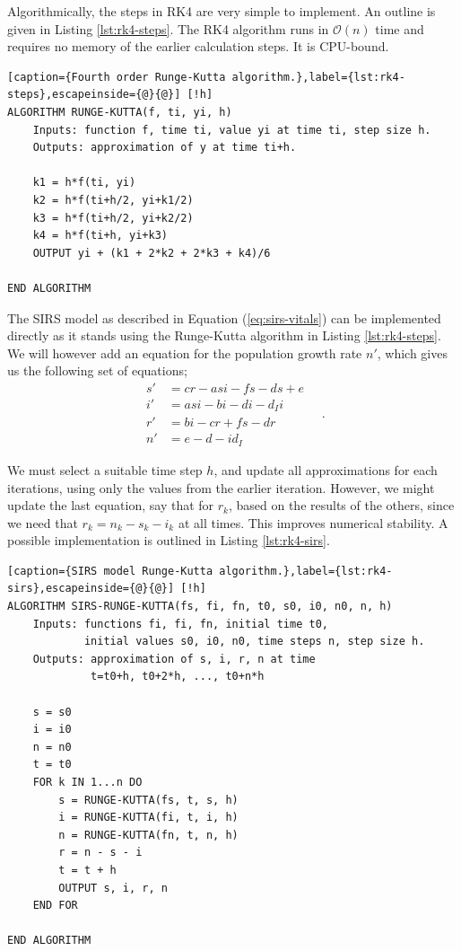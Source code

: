 \documentclass[]{article}
\begin{document}
Algorithmically, the steps in RK4 are very simple to implement. An outline is given in Listing \ref{lst:rk4-steps}. The RK4 algorithm runs in $\mathcal{O}(n)$ time and requires no memory of the earlier calculation steps. It is CPU-bound.

\begin{lstlisting}[caption={Fourth order Runge-Kutta algorithm.},label={lst:rk4-steps},escapeinside={@}{@}] [!h]
ALGORITHM RUNGE-KUTTA(f, ti, yi, h)
	Inputs: function f, time ti, value yi at time ti, step size h.
	Outputs: approximation of y at time ti+h.
	
	k1 = h*f(ti, yi)
	k2 = h*f(ti+h/2, yi+k1/2)
	k3 = h*f(ti+h/2, yi+k2/2)
	k4 = h*f(ti+h, yi+k3)
	OUTPUT yi + (k1 + 2*k2 + 2*k3 + k4)/6

END ALGORITHM
\end{lstlisting}

The SIRS model as described in Equation (\ref{eq:sirs-vitals}) can be implemented directly as it stands using the Runge-Kutta algorithm in Listing \ref{lst:rk4-steps}. We will however add an equation for the population growth rate $n'$, which gives us the following set of equations;
\begin{equation} \label{eq:sirs-rk4}
\begin{aligned}
	s' &= cr - asi - fs - ds + e \\
	i' &= asi - bi - di -d_Ii \\
	r' &= bi - cr + fs - dr \\
	n' &= e - d - id_I
\end{aligned} \quad .
\end{equation}

We must select a suitable time step $h$, and update all approximations for each iterations, using only the values from the earlier iteration. However, we might update the last equation, say that for $r_k$, based on the results of the others, since we need that $r_k = n_k - s_k - i_k$ at all times. This improves numerical stability. A possible implementation is outlined in Listing \ref{lst:rk4-sirs}.

\begin{lstlisting}[caption={SIRS model Runge-Kutta algorithm.},label={lst:rk4-sirs},escapeinside={@}{@}] [!h]
ALGORITHM SIRS-RUNGE-KUTTA(fs, fi, fn, t0, s0, i0, n0, n, h)
	Inputs: functions fi, fi, fn, initial time t0, 
			initial values s0, i0, n0, time steps n, step size h.
	Outputs: approximation of s, i, r, n at time
			 t=t0+h, t0+2*h, ..., t0+n*h
	
	s = s0
	i = i0
	n = n0
	t = t0
	FOR k IN 1...n DO
		s = RUNGE-KUTTA(fs, t, s, h)
		i = RUNGE-KUTTA(fi, t, i, h)
		n = RUNGE-KUTTA(fn, t, n, h)
		r = n - s - i
		t = t + h
		OUTPUT s, i, r, n
	END FOR

END ALGORITHM
\end{lstlisting}
\end{document}
